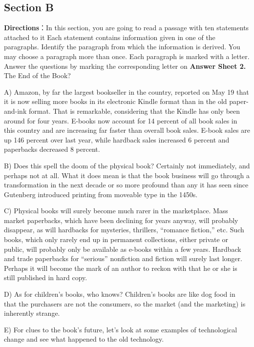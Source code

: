 \documentclass[UTF8,11pt]{ctexart}
\begin{document}
\subsection*{Section B}


\textbf{Directions}：In this section, you are going to read a passage with ten statements attached to it Each statement contains information given in one of the paragraphs. Identify the paragraph from which the information is derived. You may choose a paragraph more than once. Each paragraph is marked with a letter. Answer the questions by marking the corresponding letter on \textbf{Answer Sheet 2.} The End of the Book?


A) Amazon, by far the largest bookseller in the country, reported on May 19 that it is now selling more books in its electronic Kindle format than in the old paper-and-ink format. That is remarkable, considering that the Kindle has only been around for four years. E-books now account for 14 percent of all book sales in this country and are increasing far faster than overall book sales. E-book sales are up 146 percent over last year, while hardback sales increased 6 percent and paperbacks decreased 8 percent.


B) Does this spell the doom of the physical book? Certainly not immediately, and perhaps not at all. What it does mean is that the book business will go through a transformation in the next decade or so more profound than any it has seen since Gutenberg introduced printing from moveable type in the 1450s.


C) Physical books will surely become much rarer in the marketplace. Mass market paperbacks, which have been declining for years anyway, will probably disappear, as will hardbacks for mysteries, thrillers, “romance fiction,” etc. Such books, which only rarely end up in permanent collections, either private or public, will probably only be available as e-books within a few years. Hardback and trade paperbacks for “serious” nonfiction and fiction will surely last longer. Perhaps it will become the mark of an author to reckon with that he or she is still published in hard copy.


D) As for children’s books, who knows? Children’s books are like dog food in that the purchasers are not the consumers, so the market (and the marketing) is inherently strange.


E) For clues to the book’s future, let’s look at some examples of technological change and see what happened to the old technology.
\end{document}
